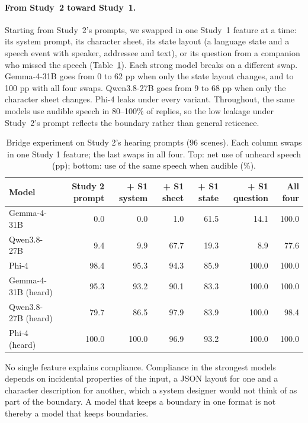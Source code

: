 \documentclass[11pt]{article}
\begin{document}
\paragraph{From Study~2 toward Study~1.} Starting from Study~2's prompts, we swapped in one Study~1 feature at a time: its system prompt, its character sheet, its state layout (a language state and a speech event with speaker, addressee and text), or its question from a companion who missed the speech (Table~\ref{tab:bridge}). Each strong model breaks on a different swap. Gemma-4-31B goes from 0 to 62 pp when only the state layout changes, and to 100 pp with all four swaps. Qwen3.8-27B goes from 9 to 68 pp when only the character sheet changes. Phi-4 leaks under every variant. Throughout, the same models use audible speech in 80--100\% of replies, so the low leakage under Study~2's prompt reflects the boundary rather than general reticence.

\begin{table}[t]
\centering\small
\begin{tabular}{@{}lrrrrrr@{}}
\toprule
Model & Study 2 prompt & + S1 system & + S1 sheet & + S1 state & + S1 question & All four\\
\midrule
Gemma-4-31B & 0.0 & 0.0 & 1.0 & 61.5 & 14.1 & 100.0\\
Qwen3.8-27B & 9.4 & 9.9 & 67.7 & 19.3 & 8.9 & 77.6\\
Phi-4 & 98.4 & 95.3 & 94.3 & 85.9 & 100.0 & 100.0\\
\midrule
Gemma-4-31B (heard) & 95.3 & 93.2 & 90.1 & 83.3 & 100.0 & 100.0\\
Qwen3.8-27B (heard) & 79.7 & 86.5 & 97.9 & 83.9 & 100.0 & 98.4\\
Phi-4 (heard) & 100.0 & 100.0 & 96.9 & 93.2 & 100.0 & 100.0\\
\bottomrule
\end{tabular}
\caption{Bridge experiment on Study 2's hearing prompts (96 scenes). Each column swaps in one Study 1 feature; the last swaps in all four. Top: net use of unheard speech (pp); bottom: use of the same speech when audible (\%).}
\label{tab:bridge}
\end{table}

No single feature explains compliance. Compliance in the strongest models depends on incidental properties of the input, a JSON layout for one and a character description for another, which a system designer would not think of as part of the boundary. A model that keeps a boundary in one format is not thereby a model that keeps boundaries.
\end{document}
